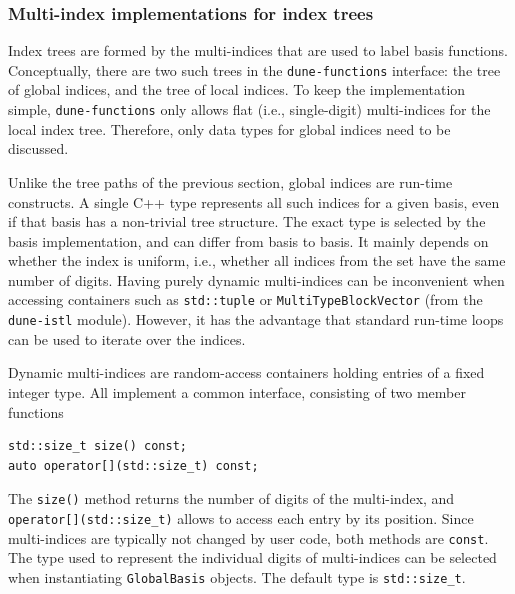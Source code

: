 \documentclass[a4paper,10pt,headings=normal,bibliography=totoc]{scrartcl}
\newcommand{\cpp}[1]{\lstinline[basicstyle=\ttfamily]!#1!}
\newcommand{\cppbreak}[1]{\lstinline[basicstyle=\ttfamily,breaklines]!#1!}
\newcommand{\dunemodule}[1]{\texttt{#1}}
\begin{document}
\subsubsection{Multi-index implementations for index trees}
\label{sec:multi_indicies_for_index_trees}

Index trees are formed by the multi-indices that are used to label basis functions.
Conceptually, there are two such trees in the \dunemodule{dune-functions} interface:
the tree of global indices, and the tree of local indices.  To keep the implementation simple,
\dunemodule{dune-functions} only allows flat (i.e., single-digit) multi-indices for the local index tree.
Therefore, only data types for global indices need to be discussed.

Unlike the tree paths of the previous section,
global indices are run-time constructs.  A single C++ type represents all such
indices for a given basis, even if that basis has a non-trivial tree structure.
The exact type is selected by the basis implementation, and can differ from basis to basis.
It mainly depends on whether the index is uniform, i.e., whether all indices from the
set have the same number of digits.
Having purely dynamic multi-indices can be inconvenient when accessing
containers such as \cpp{std::tuple}
or \cpp{MultiTypeBlockVector} (from the \dunemodule{dune-istl}
module). However, it has the advantage that standard run-time loops can be used
to iterate over the indices.

Dynamic multi-indices are random-access containers holding entries of a fixed integer type.
All implement a common interface, consisting of two member functions
%
\begin{lstlisting}[style=Interface]
std::size_t size() const;
auto operator[](std::size_t) const;
\end{lstlisting}
%
The \cpp{size()} method returns the number of digits of the multi-index,
and \cppbreak{operator[](std::size_t)} allows to access
each entry by its position. Since multi-indices are
typically not changed by user code, both methods are \cpp{const}.
The type used to represent
the individual digits of multi-indices can be selected when instantiating \cpp{GlobalBasis}
objects.  The default type is \cpp{std::size_t}.
\end{document}
